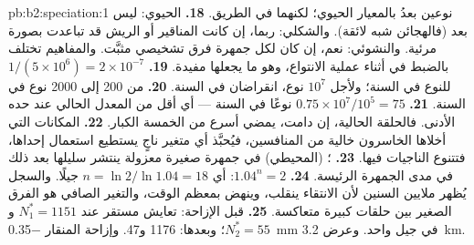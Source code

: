 \begin{solution}{pb:b2:speciation:1}
نوعين بعدُ بالمعيار الحيوي؛ لكنهما في الطريق.
\textbf{18.} الحيوي: ليس بعد (فالهجائن شبه لائقة).
والشكلي: ربما، إن كانت المناقير أو الريش قد تباعدت
بصورة مرئية. والنشوئي: نعم، إن كان لكل جمهرة فرق
تشخيصي مثبَّت. والمفاهيم تختلف بالضبط في أثناء
عملية الانتواع، وهو ما يجعلها مفيدة.
\textbf{19.} $1/(5\times 10^{6}) = 2\times 10^{-7}$ للنوع في
السنة؛ ولأجل $10^{7}$ نوع، انقراضان في السنة.
\textbf{20.} من 200 إلى 2000 نوع في السنة.
\textbf{21.} $0.75\times 10^{7}/10^{5} = 75$ نوعًا في السنة --- أي أقل
من المعدل الحالي عند حده الأدنى. فالحلقة الحالية، إن
دامت،  يمضي أسرع من الخمسة
الكبار.
\textbf{22.} المكانات التي أخلاها الخاسرون خالية من
المنافسين، فيُحبَّذ أي متغير ناجٍ يستطيع استعمال إحداها،
فتتنوع الناجيات فيها.
\textbf{23.} ؛  (المحيطي)
في جمهرة صغيرة معزولة ينتشر سليلها بعد ذلك
في مدى الجمهرة الرئيسة.
\textbf{24.} $1.04^{n} = 2$: أي $n = \ln 2/\ln 1.04 = 18$ جيلًا.
والسجل يُظهر ملايين السنين لأن الانتقاء ينقلب،
وينهض  بمعظم الوقت، والتغير الصافي
هو الفرق الصغير بين حلقات كبيرة متعاكسة.
\textbf{25.} قبل الإزاحة: تعايش مستقر عند $N_1^{*} =
1151$ و$N_2^{*} = 55$؛ وبعدها: 1176 و47. وإزاحة المنقار
\qty{-0.35}{mm} في جيل واحد. وعرض  \qty{3.2}{km}.
\end{solution}
